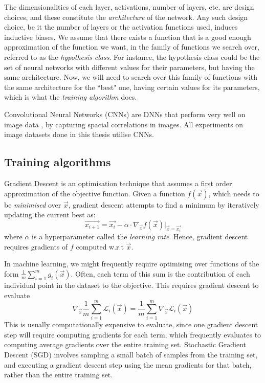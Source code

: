 \documentclass[12pt, oneside]{book}
\begin{document}
The dimensionalities of each layer, activations, number of layers, etc. are
design choices, and these constitute the \emph{architecture} of the network. Any
such design choice, be it the number of layers or the activation functions used,
induces inductive biases. We assume that there exists a function that is a good
enough approximation of the function we want, in the family of functions we
search over, referred to as the \emph{hypothesis class}. For instance, the
hypothesis class could be the set of neural networks with different values for
their parameters, but having the same architecture. Now, we will need to search
over this family of functions with the same architecture for the ``best" one,
having certain values for its parameters, which is what the \emph{training
algorithm} does.


Convolutional Neural Networks (CNNs) are DNNs that perform very well on image
data \citep{imagenet,neco.1989.1.4.541}, by capturing spacial correlations in
images. All experiments on image datasets done in this thesis utilise CNNs.

\subsection{Training algorithms}
\label{section:sgd}
Gradient Descent is an optimisation technique that assumes a first order
approximation of the objective function. Given a function $f(\vec{x})$, which
needs to be \emph{minimised} over $\vec{x}$, gradient descent attempts to find a
minimum by iteratively updating the current best as:
\begin{equation*}
    \vec{x_{i+1}}
    = \vec{x_i} -
        \alpha \cdot \nabla_\vec{x} f(\vec{x}) \bigr \rvert _{\vec{x}=\vec{x_i}}
\end{equation*}
where $\alpha$ is a hyperparameter called the \emph{learning rate}. Hence,
gradient descent requires gradients of $f$ computed w.r.t $\vec{x}$.

In machine learning, we might frequently require optimising over functions of
the form $\frac{1}{m}\sum_{i=1}^m g_i(\vec{x})$. Often, each term of this sum is
the contribution of each individual point in the dataset to the objective. This
requires gradient descent to evaluate
\begin{equation*}
    \nabla_\vec{x} \frac{1}{m}\sum_{i=1}^m \mathcal{L}_i(\vec{x})
    = \frac{1}{m} \sum_{i=1}^m \nabla_\vec{x} \mathcal{L}_i(\vec{x})
\end{equation*}
This is usually computationally expensive to evaluate, since one gradient
descent step will require computing gradients for each term, which frequently
evaluates to computing average gradients over the entire training set.
Stochastic Gradient Descent (SGD) involves sampling a small batch of samples
from the training set, and executing a gradient descent step using the mean
gradients for that batch, rather than the entire training set.
\end{document}
